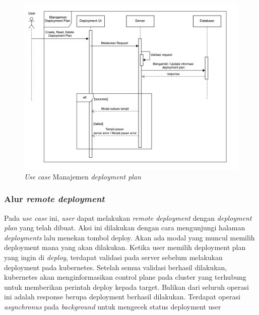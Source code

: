 \begin{figure}[ht]
  \centering
  \includegraphics[width=1\textwidth]{resources/chapter-3/usecase/uc-11.jpg}
  \caption{\textit{Use case} Manajemen \textit{deployment plan}}
  \label{fig:usecase-11}
\end{figure}

\pagebreak

\subsubsection{Alur \textit{remote deployment}}

Pada \textit{use case} ini, \textit{user} dapat melakukan \textit{remote deployment} dengan \textit{deployment plan} yang telah dibuat. Aksi ini dilakukan dengan cara mengunjungi halaman \textit{deployments} lalu menekan tombol deploy. Akan ada modal yang muncul memilih deployment mana yang akan dilakukan. Ketika user memilih deployment plan yang ingin di \textit{deploy}, terdapat validasi pada server sebelum melakukan deployment pada kubernetes. Setelah semua validasi berhasil dilakukan, kubernetes akan menginformasikan control plane pada cluster yang terhubung untuk memberikan perintah deploy kepada target. Balikan dari seluruh operasi ini adalah response berupa deployment berhasil dilakukan. Terdapat operasi \textit{asynchronus} pada \textit{background} untuk mengecek status deployment user


